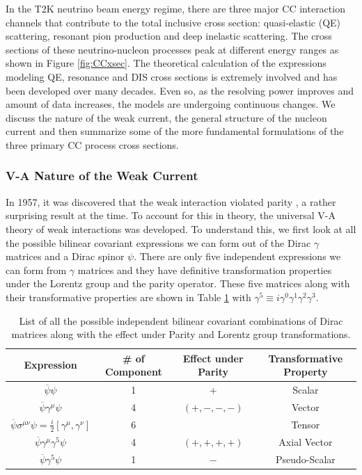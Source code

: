 In the T2K neutrino beam energy regime, there are three major CC interaction channels that contribute to the total inclusive cross section: quasi-elastic (QE) scattering, resonant pion production and deep inelastic scattering. The cross sections of these neutrino-nucleon processes peak at different energy ranges as shown in Figure \ref{fig:CCxsec}. The theoretical calculation of the expressions modeling QE, resonance and DIS cross sections is extremely involved and has been developed over many decades. Even so, as the resolving power improves and amount of data increases, the models are undergoing continuous changes. We discuss the nature of the weak current, the general structure of the nucleon current and then summarize some of the more fundamental formulations of the three primary CC process cross sections.

\subsubsection{V-A Nature of the Weak Current}

In 1957, it was discovered that the weak interaction violated parity \cite{Wu:1957}, a rather surprising result at the time. To account for this in theory, the universal V-A theory of weak interactions was developed. To understand this, we first look at all the possible bilinear covariant expressions we can form out of the Dirac $\gamma$ matrices and a Dirac spinor $\psi$. There are only five independent expressions we can form from $\gamma$ matrices and they have definitive transformation properties under the Lorentz group and the parity operator. These five matrices along with their transformative properties are shown in Table \ref{tab:currpos} with $\gamma^5\equiv i \gamma^0 \gamma^1 \gamma^2 \gamma^3$.

\begin{table}[h]
\caption{List of all the possible independent bilinear covariant combinations of Dirac matrices along with the effect under Parity and Lorentz group transformations.}
\centering
\begin{tabular}{cccc}\toprule
Expression & \# of Component & Effect under Parity & Transformative Property\\
\midrule
$\overline{\psi}\psi$ & 1 & $+$ & Scalar \\
$\overline{\psi}\gamma^\mu \psi$ & 4 & $(+,-,-,-)$ & Vector \\
$\overline{\psi} \sigma^{\mu\nu} \psi = \frac{i}{2} \left[ \gamma^\mu , \gamma^\nu \right] $ & 6 & $ $ & Tensor \\
$\overline{\psi}\gamma^\mu \gamma^5 \psi$ & 4 & $(+,+,+,+)$ & Axial Vector \\
$\overline{\psi}\gamma^5 \psi$ & 1 & $-$ & Pseudo-Scalar \\ \bottomrule
\end{tabular} 
\label{tab:currpos}
\end{table}

